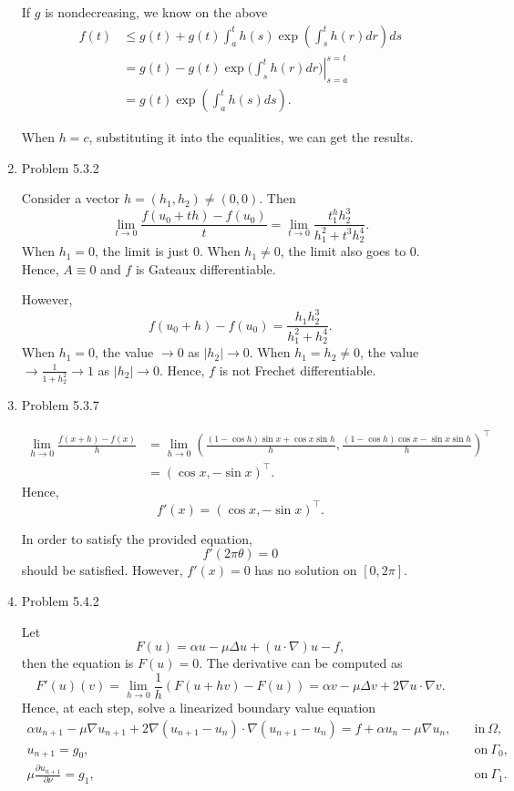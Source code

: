 \documentclass{article}%
\begin{document}
\begin{enumerate}
If $g$ is nondecreasing, we know on the above
$$
\begin{aligned}
f(t) &\le g(t) + g(t)\int_{a}^{t}h(s)\exp(\int_{s}^t h(r)dr)ds \\
&= g(t) - g(t)\exp(\left.\int_{s}^{t}h(r)dr)\right|_{s=a}^{s=t} \\
&= g(t)\exp(\int_{a}^{t}h(s)ds).
\end{aligned}
$$

When $h = c$, substituting it into the equalities, we can get the results.


\item Problem 5.3.2

Consider a vector $h = (h_1, h_2)\ne (0, 0)$. Then
$$
\lim_{t\to 0}\frac{f(u_0+th)-f(u_0)}{t} = \lim_{t\to 0}\frac{t^h_1h_2^3}{h_1^2+t^3h_2^4}.
$$
When $h_1 = 0 $, the limit is just 0. When $h_1\ne 0 $, the limit also goes to 0. Hence, $A \equiv 0$ and $f$ is Gateaux differentiable.

However, 
$$
f(u_0+h) - f(u_0) = \frac{h_1h_2^3}{h_1^2+h_2^4}.
$$
When $h_1 = 0 $, the value $\to 0$ as $|h_2|\to 0 $. When $h_1 = h_2\ne 0 $, the value $\to \frac{1}{1+h_2^2}\to 1$ as $|h_2|\to 0$. Hence, $f$ is not Frechet differentiable.

\item Problem 5.3.7

$$
\begin{aligned}
\lim_{h\to 0}\frac{f(x+h)-f(x)}{h} &= \lim_{h\to 0}\left(\frac{(1-\cos h)\sin x+ \cos x\sin h}{h}, \frac{(1-\cos h)\cos x - \sin x\sin h}{h}\right)^\top \\
&= (\cos x, -\sin x)^\top.
\end{aligned}
$$
Hence,
$$
f'(x) = (\cos x, -\sin x)^\top.
$$

In order to satisfy the provided equation,
$$
f'(2\pi \theta) = 0 
$$
should be satisfied. However, $f'(x) = 0$ has no solution on $[0, 2\pi]$. 

\item Problem 5.4.2

Let 
$$
F(u) = \alpha u - \mu \Delta u + (u\cdot \nabla) u - f,
$$
then the equation is $F(u) = 0$. The derivative can be computed as
$$
F'(u)(v) = \lim_{h\to 0}\frac{1}{h}(F(u+hv) - F(u)) = \alpha v - \mu\Delta v + 2\nabla u\cdot \nabla v.
$$
Hence, at each step, solve a linearized boundary value equation
$$
\begin{aligned}
\alpha u_{n+1} - \mu \nabla u_{n+1} + 2\nabla (u_{n+1}-u_n)\cdot \nabla (u_{n+1}- u_n) = f + \alpha u_n - \mu\nabla u_n, & \quad\text{in}~ \Omega, \\
u_{n+1} = g_0, & \quad\text{on}~ \Gamma_0, \\
\mu\frac{\partial u_{n+1}}{\partial \nu} = g_1, & \quad\text{on}~ \Gamma_1.
\end{aligned}
$$

\end{enumerate}
\end{document}
